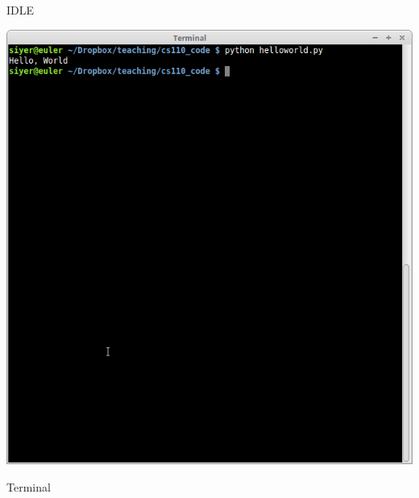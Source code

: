 \documentclass[8pt,a4paper,compress]{beamer}
\begin{document}
\begin{frame}[fragile]
\begin{minipage}{100pt}
\begin{center}
\smallskip

\tiny IDLE

\smallskip

\includegraphics[scale=0.16]{figures/terminal.png}

\smallskip

\tiny Terminal
\end{center}
\end{minipage}
\end{frame}
\end{document}
